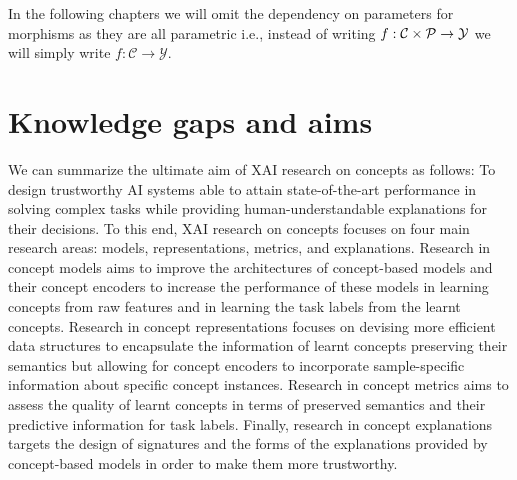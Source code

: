 
\begin{remark}
In the following chapters we will omit the dependency on parameters for morphisms as they are all parametric i.e., instead of writing $f: \mathcal{C} \times \mathcal{P} \rightarrow \mathcal{Y}$ we will simply write $f: \mathcal{C} \rightarrow \mathcal{Y}$.
\end{remark}


\section{Knowledge gaps and aims}
\label{sec:gaps-concept-learning}
We can summarize the ultimate aim of XAI research on concepts as follows: To design trustworthy AI systems able to attain state-of-the-art performance in solving complex tasks while providing human-understandable explanations for their decisions.
To this end, XAI research on concepts focuses on four main research areas: models, representations, metrics, and explanations. Research in concept models aims to improve the architectures of concept-based models and their concept encoders to increase the performance of these models in learning concepts from raw features and in learning the task labels from the learnt concepts. Research in concept representations focuses on devising more efficient data structures to encapsulate the information of learnt concepts preserving their semantics but allowing for concept encoders to incorporate sample-specific information about specific concept instances. Research in concept metrics aims to assess the quality of learnt concepts in terms of preserved semantics and their predictive information for task labels. Finally, research in concept explanations targets the design of signatures and the forms of the explanations provided by concept-based models in order to make them more trustworthy.

